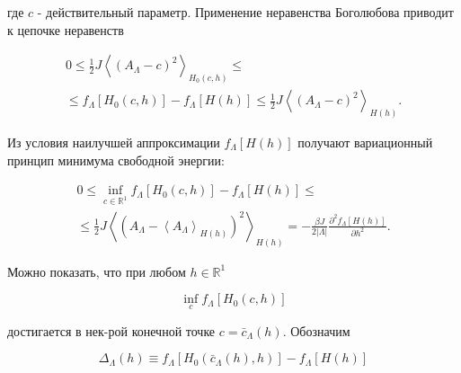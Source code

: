 \documentclass[10pt]{article}
\begin{document}
где $c$ - действительный параметр. Применение неравенства Боголюбова приводит к цепочке неравенств



\[

\begin{gathered}

0 \leqslant \frac{1}{2} J\left\langle\left(A_{\Lambda}-c\right)^{2}\right\rangle_{H_{0}(c, h)} \leqslant \\

\leqslant f_{\Lambda}\left[H_{0}(c, h)\right]-f_{\Lambda}[H(h)] \leqslant \frac{1}{2} J\left\langle\left(A_{\Lambda}-c\right)^{2}\right\rangle_{H(h)} .

\end{gathered}

\]



Из условия наилучшей аппроксимации $f_{\Lambda}[H(h)]$ получают вариационный принцип минимума свободной энергии:



\[

\begin{gathered}

0 \leqslant \inf _{c \in \mathbb{R}^{1}} f_{\Lambda}\left[H_{0}(c, h)\right]-f_{\Lambda}[H(h)] \leqslant \\

\leqslant \frac{1}{2} J\left\langle\left(A_{\Lambda}-\left\langle A_{\Lambda}\right\rangle_{H(h)}\right)^{2}\right\rangle_{H(h)}=-\frac{\beta J}{2|\Lambda|} \frac{\partial^{2} f_{\Lambda}[H(h)]}{\partial h^{2}} .

\end{gathered}

\]



Можно показать, что при любом $h \in \mathbb{R}^{1}$



\[

\inf _{c} f_{\Lambda}\left[H_{0}(c, h)\right]

\]



достигается в нек-рой конечной точке $c=\bar{c}_{\Lambda}(h)$. Обозначим



\[

\Delta_{\Lambda}(h) \equiv f_{\Lambda}\left[H_{0}\left(\bar{c}_{\Lambda}(h), h\right)\right]-f_{\Lambda}[H(h)]

\]
\end{document}
